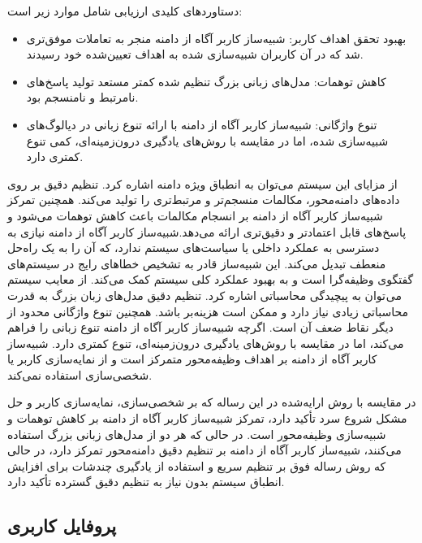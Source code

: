 \begin{enumerate}
دستاوردهای کلیدی ارزیابی شامل موارد زیر است:
\begin{itemize}
\item
بهبود تحقق اهداف کاربر: شبیه‌ساز کاربر آگاه از دامنه منجر به تعاملات موفق‌تری شد که در آن کاربران شبیه‌سازی شده به اهداف تعیین‌شده خود رسیدند.
\item
کاهش توهمات: مدل‌های زبانی بزرگ  تنظیم شده کمتر مستعد تولید پاسخ‌های نامرتبط و نامنسجم بود.
\item
تنوع واژگانی: شبیه‌ساز کاربر آگاه از دامنه با ارائه تنوع زبانی در دیالوگ‌های شبیه‌سازی شده، اما در مقایسه با روش‌های یادگیری درون‌زمینه‌ای، کمی تنوع کمتری دارد.
\end{itemize}
از مزایای این سیستم می‌توان به انطباق ویژه دامنه اشاره کرد. تنظیم دقیق بر روی داده‌های دامنه‌محور، مکالمات منسجم‌تر و مرتبط‌تری را تولید می‌کند. همچنین تمرکز شبیه‌ساز کاربر آگاه از دامنه بر انسجام مکالمات باعث کاهش توهمات می‌شود و پاسخ‌های قابل اعتمادتر و دقیق‌تری ارائه می‌دهد.شبیه‌ساز کاربر آگاه از دامنه نیازی به دسترسی به عملکرد داخلی یا سیاست‌های سیستم ندارد، که آن را به یک راه‌حل منعطف تبدیل می‌کند. این شبیه‌ساز قادر به تشخیص خطاهای رایج در سیستم‌های گفتگوی وظیفه‌گرا است و به بهبود عملکرد کلی سیستم کمک می‌کند.
\newline
از معایب سیستم 
\cite{sekulic2024reliable}
 می توان به پیچیدگی محاسباتی اشاره کرد. تنظیم دقیق مدل‌های زبان بزرگ به قدرت محاسباتی زیادی نیاز دارد و ممکن است هزینه‌بر باشد.
همچنین تنوع واژگانی محدود از دیگر نقاط ضعف آن است. اگرچه شبیه‌ساز کاربر آگاه از دامنه تنوع زبانی را فراهم می‌کند، اما در مقایسه با روش‌های یادگیری درون‌زمینه‌ای، تنوع کمتری دارد. شبیه‌ساز کاربر آگاه از دامنه بر اهداف وظیفه‌محور متمرکز است و از نمایه‌سازی کاربر یا شخصی‌سازی استفاده نمی‌کند.

در مقایسه با روش ارایه‌شده در این رساله که بر شخصی‌سازی، نمایه‌سازی کاربر و حل مشکل شروع سرد تأکید دارد، تمرکز 
\cite{sekulic2024reliable}
 شبیه‌ساز کاربر آگاه از دامنه  بر کاهش توهمات و شبیه‌سازی وظیفه‌محور است. در حالی که هر دو از مدل‌های زبانی بزرگ استفاده می‌کنند، شبیه‌ساز کاربر آگاه از دامنه  بر تنظیم دقیق دامنه‌محور تمرکز دارد، در حالی که روش رساله فوق بر تنظیم سریع و استفاده از یادگیری چند‌شات برای افزایش انطباق سیستم بدون نیاز به تنظیم دقیق گسترده تأکید دارد.

\end{enumerate}

\subsection{پروفایل کاربری}
